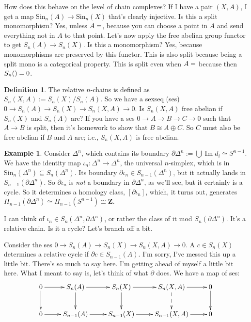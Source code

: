 \documentclass{amsart}
\theoremstyle{theorem}
\theoremstyle{definition}
\newtheorem{definition}[theorem]{Definition}
\newtheorem{example}[theorem]{Example}
\DeclareMathOperator{\img}{Im}
\newcommand{\Sin}{\mathrm{Sin}}
\begin{document}
How does this behave on the level of chain complexes? If I have a pair $(X,A)$, I get a map $\Sin_n(A)\to \Sin_n(X)$ that's clearly injective. Is this a split monomorphism? Yes, unless $A=\empty$, because you can choose a point in $A$ and send everything not in $A$ to that point. Let's now apply the free abelian group functor to get $S_n(A)\to S_n(X)$. Is this a monomorphism? Yes, because monomorphisms are preserved by this functor. This is also split because being a split mono is a categorical property. This is split even when $A=\empty$ because then $S_n(\empty)=0$.
\begin{definition}
The relative $n$-chains is defined as $S_n(X,A):= S_n(X)/S_n(A)$. So we have a sexseq (ses) $0\to S_n(A)\to S_n(X)\to S_n(X,A)\to 0$. Is $S_n(X,A)$ free abelian if $S_n(X)$ and $S_n(A)$ are? If you have a ses $0\to A\to B\to C\to 0$ such that $A\to B$ is split, then it's homework to show that $B\cong A\oplus C$. So $C$ must also be free abelian if $B$ and $A$ are; i.e., $S_n(X,A)$ is free abelian.
\end{definition}
\begin{example}
Consider $\Delta^n$, which contains its boundary $\partial\Delta^n:=\bigcup \img d_i\simeq S^{n-1}$. We have the identity map $\iota_n:\Delta^n\to \Delta^n$, the universal $n$-simplex, which is in $\Sin_n(\Delta^n)\subseteq S_n(\Delta^n)$. Its boundary $\partial\iota_n\in S_{n-1}(\Delta^n)$, but it actually lands in $S_{n-1}(\partial\Delta^n)$. So $\partial\iota_n$ is \emph{not} a boundary in $\partial\Delta^n$, as we'll see, but it certainly is a cycle. So it determines a homology class, $[\partial\iota_n]$, which, it turns out, generates $ H_{n-1}(\partial\Delta^n)\simeq H_{n-1}(S^{n-1})\cong\mathbf{Z}$.

I can think of $\iota_n\in S_n(\Delta^n,\partial\Delta^n)$, or rather the class of it mod $S_n(\partial\Delta^n)$. It's a relative chain. Is it a cycle? Let's branch off a bit.
\end{example}
Consider the ses $0\to S_n(A)\to S_n(X)\to S_n(X,A)\to 0$. A $c\in S_n(X)$ determines a relative cycle if $\partial c\in S_{n-1}(A)$. I'm sorry, I've messed this up a little bit. There's so much to say here. I'm getting ahead of myself a little bit here. What I meant to say is, let's think of what $\partial$ does. We have a map of ses:
\begin{equation*}
\xymatrix{0\ar[d]\ar[r] & S_n(A)\ar[d]\ar[r] & S_n(X)\ar[d]\ar[r] & S_n(X,A)\ar@{-->}[d]\ar[r] & 0\ar[d]\\
0\ar[r] & S_{n-1}(A)\ar[r] & S_{n-1}(X)\ar[r] & S_{n-1}(X,A)\ar[r] & 0}
\end{equation*}
\end{document}
